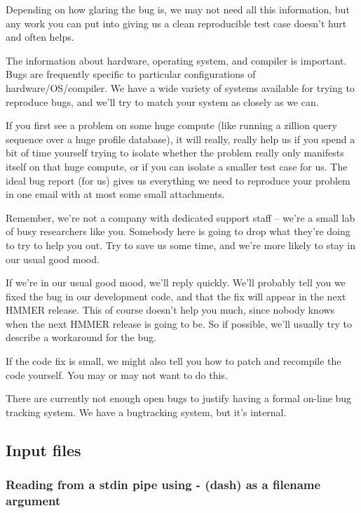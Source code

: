 Depending on how glaring the bug is, we may not need all this
information, but any work you can put into giving us a clean
reproducible test case doesn't hurt and often helps.

The information about hardware, operating system, and compiler is
important. Bugs are frequently specific to particular configurations
of hardware/OS/compiler.  We have a wide variety of systems available
for trying to reproduce bugs, and we'll try to match your system as
closely as we can.

If you first see a problem on some huge compute (like running a
zillion query sequence over a huge profile database), it will really,
really help us if you spend a bit of time yourself trying to isolate
whether the problem really only manifests itself on that huge compute,
or if you can isolate a smaller test case for us. The ideal bug report
(for us) gives us everything we need to reproduce your problem in one
email with at most some small attachments. 

Remember, we're not a company with dedicated support staff -- we're a
small lab of busy researchers like you. Somebody here is going to drop
what they're doing to try to help you out. Try to save us some time,
and we're more likely to stay in our usual good mood.

If we're in our usual good mood, we'll reply quickly.  We'll probably
tell you we fixed the bug in our development code, and that the fix
will appear in the next HMMER release. This of course doesn't help you
much, since nobody knows when the next HMMER release is going to be.
So if possible, we'll usually try to describe a workaround for the
bug.

If the code fix is small, we might also tell you how to patch and
recompile the code yourself. You may or may not want to do this.


There are currently not enough open bugs to justify having a formal
on-line bug tracking system. We have a bugtracking system, but it's
internal.


\subsection{Input files}

\subsubsection{Reading from a stdin pipe using - (dash) as a filename argument}

